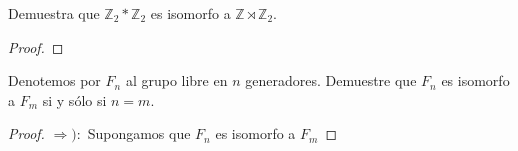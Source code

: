 \documentclass[12pt]{report}
\theoremstyle{largebreak}
\begin{document}
    \begin{excer}
        Demuestra que $\mathbb{Z}_2*\mathbb{Z}_2$ es isomorfo a $\mathbb{Z}\rtimes\mathbb{Z}_2$.
    \end{excer}

    \begin{proof}
        
    \end{proof}

    \begin{excer}
        Denotemos por $F_n$ al grupo libre en $n$ generadores. Demuestre que $F_n$ es isomorfo a $F_m$ si y sólo si $n=m$.
    \end{excer}

    \begin{proof}
        $\Rightarrow):$ Supongamos que $F_n$ es isomorfo a $F_m$
    \end{proof}
\end{document}
